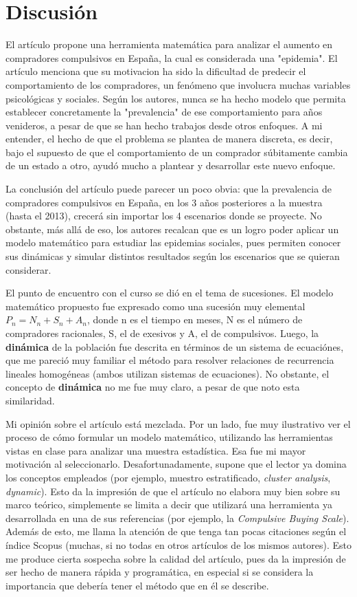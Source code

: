 \documentclass[11pt]{article}
\begin{document}
\section{Discusión}
\label{sec-3}
El artículo propone una herramienta matemática para analizar el aumento en compradores compulsivos en España, la cual es 
considerada una "epidemia". El artículo menciona que su motivacion ha sido la dificultad de predecir el 
comportamiento de los compradores, un fenómeno que involucra muchas variables psicológicas y sociales. Según los autores, nunca se 
ha hecho modelo que permita establecer concretamente la "prevalencia" de ese comportamiento para años venideros, a pesar de que se han hecho trabajos 
desde otros enfoques. A mi entender, el hecho de que el problema se plantea de manera discreta, es decir, bajo el supuesto de que el comportamiento 
de un comprador súbitamente cambia de un estado a otro, ayudó mucho a plantear y desarrollar este nuevo enfoque.

La conclusión del artículo puede parecer un poco obvia: que la prevalencia de compradores compulsivos en España, en los 3 años posteriores a la 
muestra (hasta el 2013), crecerá sin importar los 4 escenarios donde se proyecte. No obstante, más allá de eso, los autores recalcan que es un logro 
poder aplicar un modelo matemático para estudiar las epidemias sociales, pues permiten conocer sus dinámicas y simular distintos resultados según 
los escenarios que se quieran considerar. 

El punto de encuentro con el curso se dió en el tema de sucesiones. El modelo matemático propuesto fue expresado como una
sucesión muy elemental \(P_{n}= N_{n} + S_{n} + A_{n}\), donde n es el tiempo en meses, N es el número de compradores racionales, S, el de exesivos y 
A, el de compulsivos.  Luego, la \textbf{dinámica} de la población fue descrita en términos de un sistema de ecuaciónes, que me pareció muy 
familiar el método para resolver relaciones de recurrencia lineales homogéneas (ambos utilizan sistemas de ecuaciones). No obstante, el concepto de \textbf{dinámica}
no me fue muy claro, a pesar de que noto esta similaridad. 

Mi opinión sobre el artículo está mezclada. Por un lado, fue muy ilustrativo ver el proceso de cómo formular un modelo matemático,
 utilizando las herramientas vistas en clase para analizar una muestra
estadística. Esa fue mi mayor motivación al seleccionarlo. 
Desafortunadamente, supone que el lector
 ya domina los conceptos empleados (por ejemplo, 
muestro estratificado, \emph{cluster analysis}, \emph{dynamic}). Esto da la impresión de que el artículo no elabora muy bien sobre su marco teórico, simplemente se limita a decir que utilizará una herramienta
ya desarrollada en una de sus referencias (por ejemplo, la \emph{Compulsive Buying Scale}). Además de esto, me llama la atención de que tenga tan pocas citaciones según el índice Scopus (muchas, si no todas
en otros artículos de los mismos autores). Esto me produce cierta sospecha sobre la calidad del artículo, pues da la impresión de ser hecho de manera rápida y programática, en especial si se considera
la importancia que debería tener el método que en él se describe.
\end{document}
